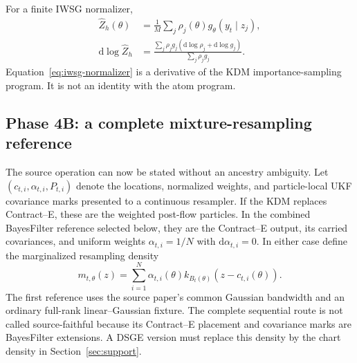 \documentclass[11pt]{article}
\newcommand{\dd}{\mathrm{d}}
\begin{document}
For a finite IWSG normalizer,
\begin{align}
 \widehat Z_h(\theta)
   &=\frac{1}{M}\sum_j
       \rho_j(\theta)g_\theta(y_t\mid z_j),\\
 \dd\log\widehat Z_h
   &=\frac{\sum_j\rho_jg_j
       \left(\dd\log\rho_j+\dd\log g_j\right)}
           {\sum_j\rho_jg_j}.
 \label{eq:iwsg-normalizer}
\end{align}
Equation~\eqref{eq:iwsg-normalizer} is a derivative of the KDM
importance-sampling program.  It is not an identity with the atom program.

\subsection{Phase 4B: a complete mixture-resampling reference}

The source operation can now be stated without an ancestry ambiguity.  Let
$(c_{t,i},\alpha_{t,i},P_{t,i})$ denote the locations, normalized weights, and
particle-local UKF covariance marks presented to a continuous resampler.  If
the KDM replaces Contract--E, these are the weighted post-flow particles.  In
the combined BayesFilter reference selected below, they are the Contract--E
output, its carried covariances, and uniform weights
$\alpha_{t,i}=1/N$ with $\dd\alpha_{t,i}=0$.  In either case define the
marginalized resampling density
\begin{equation}
 m_{t,\theta}(z)=\sum_{i=1}^N
   \alpha_{t,i}(\theta)k_{B_t(\theta)}
      (z-c_{t,i}(\theta)).
 \label{eq:phase4b-mixture}
\end{equation}
The first reference uses the source paper's common Gaussian bandwidth and an
ordinary full-rank linear--Gaussian fixture.  The complete sequential route is
not called source-faithful because its Contract--E placement and covariance
marks are BayesFilter extensions.  A DSGE version must replace this density by
the chart density in Section~\ref{sec:support}.
\end{document}
